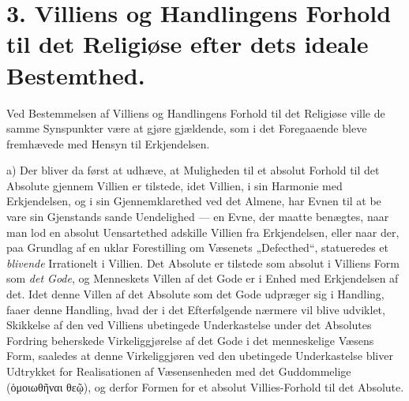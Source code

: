 \section*{3. Villiens og Handlingens Forhold til det Religiøse efter dets ideale Bestemthed.}

Ved Bestemmelsen af Villiens og Handlingens Forhold til det Religiøse ville de
samme Synspunkter være at gjøre gjældende, som i det Foregaaende bleve
fremhævede med Hensyn til Erkjendelsen.

a) Der bliver da først at udhæve, at Muligheden til et absolut Forhold til det
Absolute gjennem Villien er tilstede, idet Villien, i sin Harmonie med
Erkjendelsen, og i sin Gjennemklarethed ved det Almene, har Evnen til at be\-%
vare sin Gjenstands sande Uendelighed --- en Evne, der maatte benægtes, naar man
lod en absolut Uensartethed adskille Villien fra Erkjendelsen, eller naar der,
paa Grundlag af en uklar Forestilling om Væsenets „Defecthed“, statueredes et
\emph{blivende} Irrationelt i Villien. Det Absolute er tilstede som absolut i
Villiens Form som \emph{det Gode}, og Menneskets Villen af det Gode er i Enhed
med Erkjendelsen af det. Idet denne Villen af det Absolute som det Gode
udpræger sig i Handling, faaer denne Handling, hvad der i det Efterfølgende
nærmere vil blive udviklet, Skikkelse af den ved Villiens ubetingede
Underkastelse under det Absolutes Fordring beherskede Virkeliggjørelse af det
Gode i det menneskelige Væsens Form, saaledes at denne Virkeliggjøren ved den
ubetingede Underkastelse bliver Udtrykket for Realisationen af Væsensenheden
med det Guddommelige (ὁμοιωθῆναι θεῷ), og derfor Formen for et absolut
Villies-Forhold til det Absolute.

